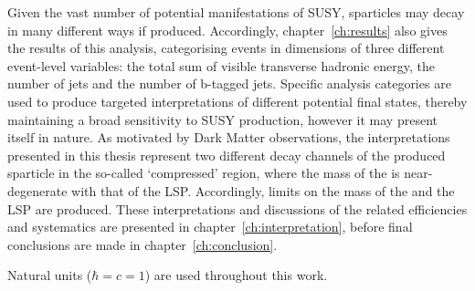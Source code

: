 Given the vast number of potential manifestations of SUSY, sparticles may
decay in many different ways if produced. Accordingly, chapter~\ref{ch:results}
also gives the results of this analysis, categorising events in dimensions
of three different event-level variables: the total sum of visible transverse
hadronic energy, the number of jets and the number of b-tagged jets.
Specific analysis categories are used to produce targeted
interpretations of different potential final states, thereby maintaining a broad
sensitivity to SUSY production, however it may present itself in nature. As
motivated by Dark Matter observations, the interpretations presented in this
thesis represent two different decay channels of the produced \sTop
sparticle in the so-called `compressed' region, where the mass of the \sTop is
near-degenerate with that of the LSP. Accordingly, limits on the mass of
the \sTop and the LSP are produced. These interpretations
and discussions of the related efficiencies and systematics are presented in
chapter~\ref{ch:interpretation}, before final conclusions are made in
chapter~\ref{ch:conclusion}.

Natural units ($\hbar = c = 1$) are used throughout this work.

